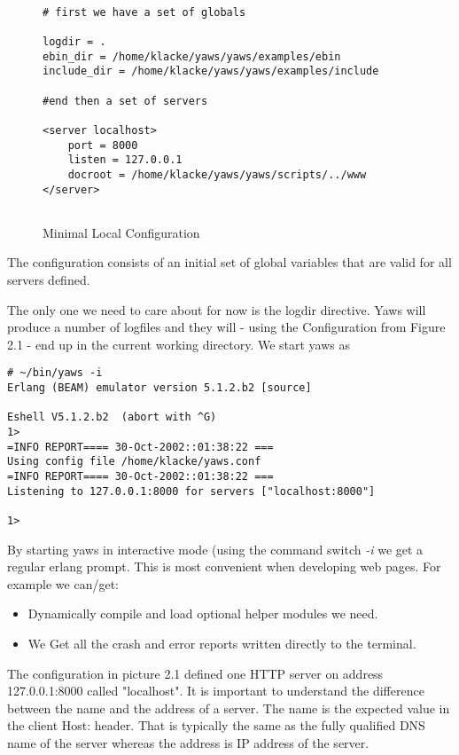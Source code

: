\documentclass[11pt,oneside,english]{book}
\begin{document}
\begin{figure}[h]
\begin{verbatim}

# first we have a set of globals

logdir = .
ebin_dir = /home/klacke/yaws/yaws/examples/ebin
include_dir = /home/klacke/yaws/yaws/examples/include

#end then a set of servers

<server localhost>
	port = 8000
	listen = 127.0.0.1
	docroot = /home/klacke/yaws/yaws/scripts/../www
</server>


\end{verbatim}
\caption{Minimal Local Configuration}
\end{figure}

The configuration consists of an initial set of global
variables that are valid for all servers defined.

The only one we need to care about for now is the logdir
directive. Yaws will produce a number of logfiles and they will -
using the Configuration from Figure 2.1 - end up in the current 
working directory.
We start yaws as 
\begin{verbatim}
# ~/bin/yaws -i
Erlang (BEAM) emulator version 5.1.2.b2 [source]

Eshell V5.1.2.b2  (abort with ^G)
1> 
=INFO REPORT==== 30-Oct-2002::01:38:22 ===
Using config file /home/klacke/yaws.conf
=INFO REPORT==== 30-Oct-2002::01:38:22 ===
Listening to 127.0.0.1:8000 for servers ["localhost:8000"]

1> 
\end{verbatim}

By starting yaws in interactive mode (using the command switch \textit{-i}
we get a regular erlang prompt. This is most convenient when developing
web pages. For example we can/get:
\begin{itemize}
\item{Dynamically compile and load optional helper modules we need.}
\item{We Get all the crash and error reports written directly to the
terminal.}
\end{itemize}

The configuration in picture 2.1 defined one HTTP server on
address 127.0.0.1:8000 called "localhost".
It is important to understand the difference between the name and
the address of a server. The name is the expected value in the
client Host: header. That is typically the same as the fully qualified
DNS name of the server whereas the address is IP address of the server.
\end{document}
